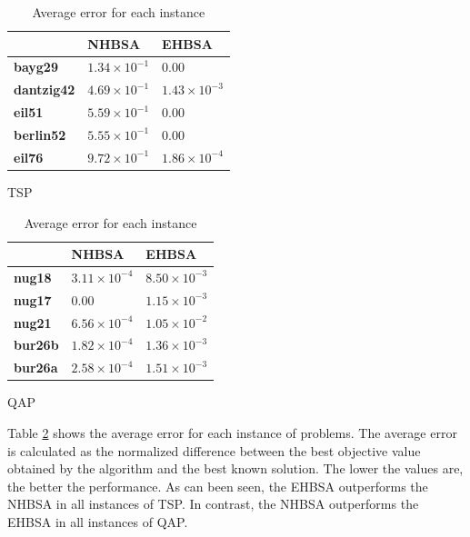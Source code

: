 \begin{table}[t]
    \centering
    \begin{subtable}{.45\linewidth}\centering
        \begin{tabular}{|l|l|l|}
        \hline
                           & \textbf{NHBSA} & \textbf{EHBSA} \\ \hline
        \textbf{bayg29}    & $1.34\times 10^{-1}$       & $0.00$       \\ \hline
        \textbf{dantzig42} & $4.69\times 10^{-1}$       & $1.43\times 10^{-3}$       \\ \hline
        \textbf{eil51}     & $5.59\times 10^{-1}$       & $0.00$       \\ \hline
        \textbf{berlin52}  & $5.55\times 10^{-1}$       & $0.00$       \\ \hline
        \textbf{eil76}     & $9.72\times 10^{-1}$       & $1.86\times 10^{-4}$      \\ \hline
        \end{tabular}
        \caption{TSP}
        \label{tb:TSP}
    \end{subtable}
    \hfill{}
    \begin{subtable}{.45\linewidth}\centering
        \begin{tabular}{|l|l|l|}
        \hline
                        & \textbf{NHBSA} & \textbf{EHBSA} \\ \hline
        \textbf{nug18}  & $3.11\times 10^{-4}$       & $8.50\times 10^{-3}$       \\ \hline
        \textbf{nug17}  & $0.00$       & $1.15\times 10^{-3}$       \\ \hline
        \textbf{nug21}  & $6.56\times 10^{-4}$       & $1.05\times 10^{-2}$       \\ \hline
        \textbf{bur26b} & $1.82\times 10^{-4}$       & $1.36\times 10^{-3}$       \\ \hline
        \textbf{bur26a} & $2.58\times 10^{-4}$       & $1.51\times 10^{-3}$       \\ \hline
        \end{tabular}
        \caption{QAP}
        \label{QAP}
    \end{subtable}
\caption{Average error for each instance}
\label{tb:model_choosing}
\end{table}

Table \ref{tb:model_choosing} shows the average error for each instance of problems. The average error is calculated as the normalized difference between the best objective value obtained by the algorithm and the best known solution. The lower the values are, the better the performance. As can been seen, the EHBSA outperforms the NHBSA in all instances of TSP. In contrast, the NHBSA outperforms the EHBSA in all instances of QAP. 

